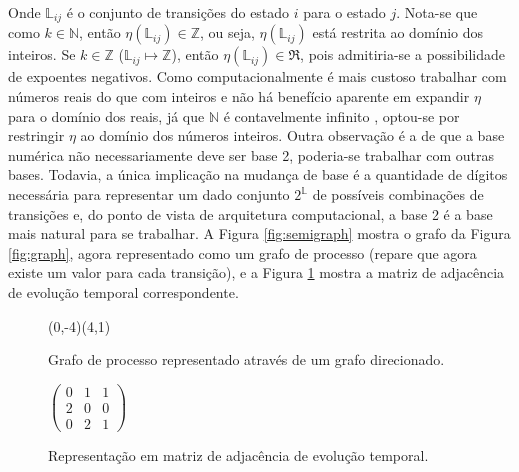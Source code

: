 \documentclass[12pt,a4paper]{article}
\let\vState=\origState
\begin{document}
Onde $\mathbb{L}_{ij}$ é o conjunto de transições do estado $i$ para o estado
$j$. Nota-se que como $k \in \mathbb{N}$, então $\eta(\mathbb{L}_{ij}) \in \mathbb{Z}$,
ou seja, $\eta(\mathbb{L}_{ij})$ está restrita ao domínio dos inteiros. Se
$k \in \mathbb{Z}$ ($\mathbb{L}_{ij} \mapsto \mathbb{Z}$), então
$\eta(\mathbb{L}_{ij}) \in \Re$, pois admitiria-se a possibilidade de expoentes negativos.
Como computacionalmente é mais custoso trabalhar com números reais do que com inteiros
e não há benefício aparente em expandir $\eta$ para o domínio dos reais,
já que $\mathbb{N}$ é contavelmente infinito , optou-se
por restringir $\eta$ ao domínio dos números inteiros. Outra observação
é a de que a base numérica não necessariamente deve ser base 2, poderia-se trabalhar com outras
bases. Todavia, a única implicação na mudança de base é a quantidade de dígitos
necessária para representar um dado conjunto $2^{\mathbb{L}}$ de possíveis combinações de
transições e, do ponto de vista de arquitetura computacional, a base 2 é a
base mais natural para se trabalhar. A Figura \ref{fig:semigraph}
mostra o grafo da Figura \ref{fig:graph}, agora representado como um grafo de processo
(repare que agora existe um valor para cada transição), e a Figura \ref{fig:iadjm}
mostra a matriz de adjacência de evolução temporal correspondente.

\begin{figure}[ht]
\begin{minipage}[b]{0.5\linewidth}
\begin{center}
\begin{VCPicture}{(0,-4)(4,1)}
\vState[1]{(0,0)}{A} \vState[2]{(4,0)}{B}
\vState[3]{(2,-2)}{C}
 
 
\end{VCPicture}
\caption{Grafo de processo representado através de um grafo direcionado.}
\label{fig:semigraph}
\end{center}
\end{minipage}
\hspace{0.5cm}
\begin{minipage}[b]{0.5\linewidth}
\begin{center}
\begin{math}
\begin{pmatrix}
0 & 1 & 1 \\
2 & 0 & 0 \\
0 & 2 & 1
\end{pmatrix}
\end{math}
\caption{Representação em matriz de adjacência de evolução temporal.}
\label{fig:iadjm}
\end{center}
\end{minipage}
\end{figure}
\end{document}
